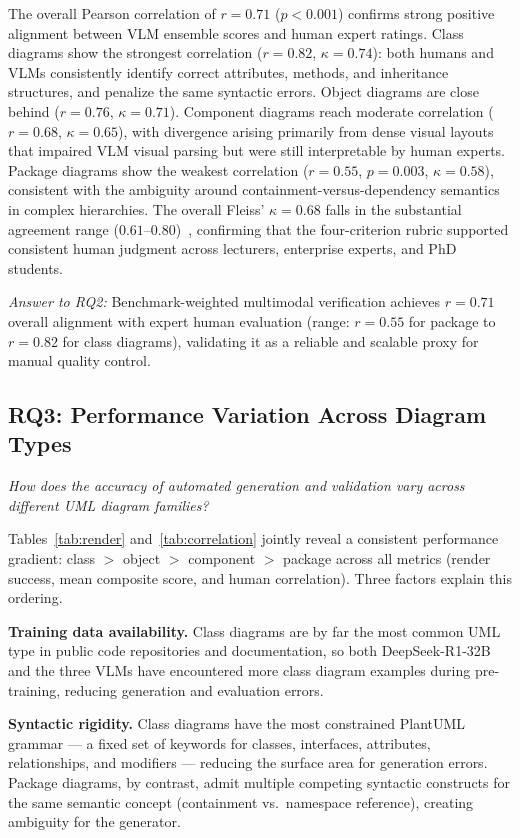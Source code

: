 \documentclass[conference]{IEEEtran}
\begin{document}
The overall Pearson correlation of $r = 0.71$ ($p < 0.001$) confirms
strong positive alignment between VLM ensemble scores and human expert
ratings. Class diagrams show the strongest correlation ($r = 0.82$,
$\kappa = 0.74$): both humans and VLMs consistently identify correct
attributes, methods, and inheritance structures, and penalize the
same syntactic errors. Object diagrams are close behind
($r = 0.76$, $\kappa = 0.71$). Component diagrams reach moderate
correlation ($r = 0.68$, $\kappa = 0.65$), with divergence arising
primarily from dense visual layouts that impaired VLM visual parsing
but were still interpretable by human experts. Package diagrams show
the weakest correlation ($r = 0.55$, $p = 0.003$, $\kappa = 0.58$),
consistent with the ambiguity around containment-versus-dependency
semantics in complex hierarchies. The overall Fleiss' $\kappa = 0.68$
falls in the substantial agreement range ($0.61$--$0.80$)~\cite{viera2005},
confirming that the four-criterion rubric supported consistent human
judgment across lecturers, enterprise experts, and PhD students.

\textit{Answer to RQ2:} Benchmark-weighted multimodal verification
achieves $r = 0.71$ overall alignment with expert human evaluation
(range: $r = 0.55$ for package to $r = 0.82$ for class diagrams),
validating it as a reliable and scalable proxy for manual quality
control.

\subsection{RQ3: Performance Variation Across Diagram Types}

\textit{How does the accuracy of automated generation and validation
vary across different UML diagram families?}

Tables~\ref{tab:render} and~\ref{tab:correlation} jointly reveal a
consistent performance gradient: class $>$ object $>$ component $>$
package across all metrics (render success, mean composite score, and
human correlation). Three factors explain this ordering.

\textbf{Training data availability.} Class diagrams are by far the
most common UML type in public code repositories and documentation,
so both DeepSeek-R1-32B and the three VLMs have encountered more
class diagram examples during pre-training, reducing generation and
evaluation errors.

\textbf{Syntactic rigidity.} Class diagrams have the most
constrained PlantUML grammar — a fixed set of keywords for classes,
interfaces, attributes, relationships, and modifiers — reducing the
surface area for generation errors. Package diagrams, by contrast,
admit multiple competing syntactic constructs for the same semantic
concept (containment vs.\ namespace reference), creating ambiguity
for the generator.
\end{document}
